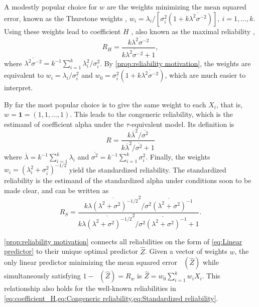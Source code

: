 \documentclass[twoside]{article}
\DeclareMathOperator{\MSE}{MSE_Z}
\begin{document}
A modestly popular choice for $w$ are the weights minimizing the mean squared error, known as the Thurstone weights \citep{thurshronebook}, $w_{i}=\lambda_{i}/[\sigma_{i}^{2}(1+k\overline{\lambda^{2}\sigma^{-2}})],\:i=1,\ldots,k$. Using these weights lead to coefficient $H$ \citep{hancock2001rethinking}, also known as the maximal reliability \citep{Li1997-yh}, 
\begin{equation}
\label{eq:coefficient_H}
 R_{H}=\frac{k\overline{\lambda^{2}\sigma^{-2}}}{k\overline{\lambda^{2}\sigma^{-2}}+1},
\end{equation}
where $\overline{\lambda^{2}\sigma^{-2}} = k^{-1}\sum_{i=1}^{k}\lambda_{i}^2/\sigma_i^2$. By \cref{prop:reliability motivation}, the weights are equivalent to $w_i = \lambda_i/\sigma_i^2$ and $w_0 = \sigma_{i}^{2}(1+k\overline{\lambda^{2}\sigma^{-2}})$, which are much easier to interpret.

By far the most popular choice is to give the same weight to each $X_i$, that is, $w = \boldsymbol{1}=(1,1,\ldots,1)$. This leads to the congeneric reliability, which is the estimand of coefficient alpha under the $\tau$-equivalent model. Its definition is
\begin{equation}
 R =\frac{k\overline{\lambda}^{2}/\overline{\sigma^{2}}}{k\overline{\lambda}^{2}/\overline{\sigma^{2}} + 1}\label{eq:Congeneric reliability}
\end{equation}
where $\overline{\lambda}=k^{-1}\sum_{i=1}^{k}\lambda_{i}$ and
$\overline{\sigma^{2}}=k^{-1}\sum_{i=1}^{k}\sigma_{i}^{2}$. 
Finally, the weights $w_i = (\lambda_i^2 + \sigma_i^2)^{-1/2}$ yield the standardized reliability. The standardized reliability is the estimand of the standardized alpha under conditions soon to be made clear, and can be written as
\begin{equation}
 R_S=\frac{k\overline{\lambda(\lambda^{2}+\sigma^{2})^{-1/2}}^{2}/\overline{\sigma^{2}(\lambda^{2}+\sigma^{2})^{-1}}}{k\overline{\lambda(\lambda^{2}+\sigma^{2})^{-1/2}}^{2}/\overline{\sigma^{2}(\lambda^{2}+\sigma^{2})^{-1}}+1}.\label{eq:Standardized reliability}
\end{equation}

\cref{prop:reliability motivation} connects all reliabilities on the form of \cref{eq:Linear predictor} to their unique optimal predictor $\hat{Z}$. Given a vector of weights $w$, the only linear predictor minimizing the mean squared error $\MSE(\hat{Z})$ while simultaneously satisfying $1-\MSE(\hat{Z})=R_w$ is $\hat{Z}=w_0\sum_{i=1}^k w_iX_i$. This relationship also holds for the well-known reliabilities in \cref{eq:coefficient_H,eq:Congeneric reliability,eq:Standardized reliability}.
\end{document}
